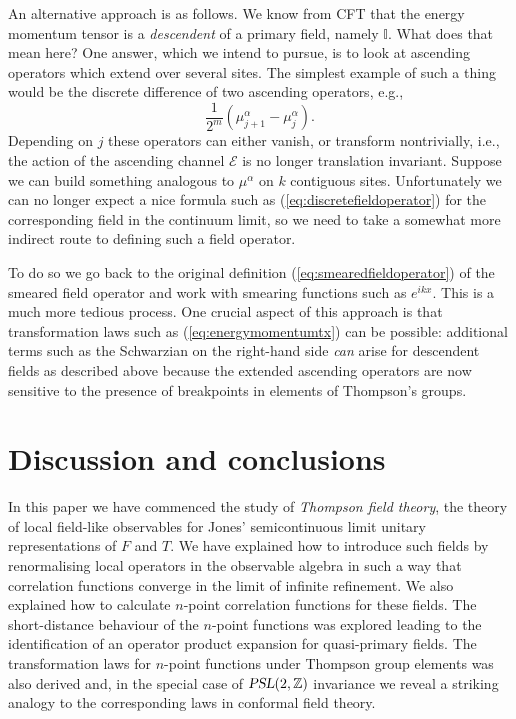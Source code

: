 \documentclass[11pt,oneside]{amsart}
\theoremstyle{plain}%
\theoremstyle{definition}
\theoremstyle{remark}
\begin{document}
An alternative approach is as follows. We know from CFT that the energy momentum tensor is a \emph{descendent} of a primary field, namely $\mathbb{I}$. What does that mean here? One answer, which we intend to pursue, is to look at ascending operators which extend over several sites. The simplest example of such a thing would be the discrete difference of two ascending operators, e.g.,
\begin{equation}
	\frac{1}{2^m}(\mu^{\alpha}_{j+1} - \mu^\alpha_{j}).
\end{equation}
Depending on $j$ these operators can either vanish, or transform nontrivially, i.e., the action of the ascending channel $\mathcal{E}$ is no longer translation invariant. Suppose we can build something analogous to $\mu^\alpha$ on $k$ contiguous sites. Unfortunately we can no longer expect a nice formula such as (\ref{eq:discretefieldoperator}) for the corresponding field in the continuum limit, so we need to take a somewhat more indirect route to defining such a field operator.

To do so we go back to the original definition (\ref{eq:smearedfieldoperator}) of the smeared field operator and work with smearing functions such as $e^{ikx}$. This is a much more tedious process. One crucial aspect of this approach is that transformation laws such as (\ref{eq:energymomentumtx}) can be possible: additional terms such as the Schwarzian on the right-hand side \emph{can} arise for descendent fields as described above because the extended ascending operators are now sensitive to the presence of breakpoints in elements of Thompson's groups.


\section{Discussion and conclusions}
In this paper we have commenced the study of \emph{Thompson field theory}, the theory of local field-like observables for Jones' semicontinuous limit unitary representations of $F$ and $T$. We have explained how to introduce such fields by renormalising local operators in the observable algebra in such a way that correlation functions converge in the limit of infinite refinement. We also explained how to calculate $n$-point correlation functions for these fields. The short-distance behaviour of the $n$-point functions was explored leading to the identification of an operator product expansion for quasi-primary fields. The transformation laws for $n$-point functions under Thompson group elements was also derived and, in the special case of $\textsl{PSL}(2,\mathbb{Z})$ invariance we reveal a striking analogy to the corresponding laws in conformal field theory.
\end{document}
